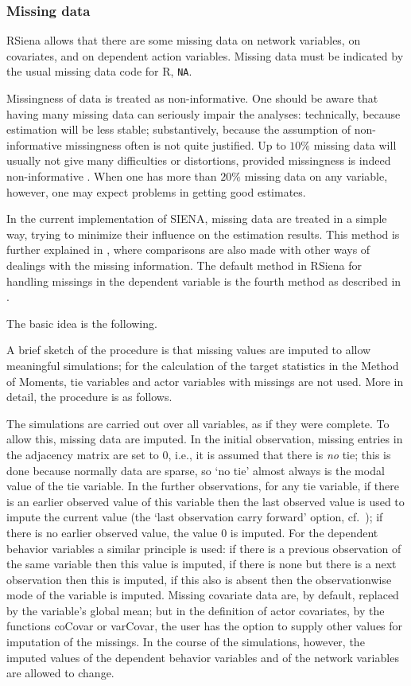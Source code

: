 \documentclass[a4paper,fleqn,11pt]{article}
\newcommand{\+}{\, + \,}
\newcommand{\sfn}[1]{\textsf{#1}}
\newcommand{\Rn}{{\sf R}}
\newcommand{\RS}{{\sf \textsf{RSiena} }}
\newcommand{\si}{{\sf SIENA}}
\begin{document}
\subsubsection{Missing data}
\label{S_missing}

\RS allows that there are some missing data on network variables,
on covariates, and on dependent action
variables.  Missing data must be indicated by
the usual missing data code for \Rn, \texttt{NA}.

Missingness of data is treated as non-informative.
One should be aware that having many missing data can seriously
impair the analyses: technically, because estimation will be
less stable; substantively, because the assumption of
non-informative missingness often is not quite justified.
Up to $10\%$ missing data will usually not give many difficulties
or distortions, provided missingness is indeed non-informative
\citep{HuismanSteglich08}.
When one has more than $20\%$ missing data on any variable, however,
one may expect problems in getting good estimates.

In the current implementation of \si, missing data are treated in
a simple way, trying to minimize their influence on the estimation
results.
This method is further explained in \citet{HuismanSteglich08},
where comparisons are also made with other ways of dealings with the missing
information. The default method in \RS for handling missings in the dependent
variable is the fourth method as described in \citet{HuismanSteglich08}.

The basic idea is the following.
\medskip

A brief sketch of the procedure is that
missing values are imputed to allow meaningful simulations;
for the calculation of the target statistics in the Method of Moments,
tie variables and actor variables with missings are not
used.
More in detail, the procedure is as follows.

The simulations are carried out over all variables,
as if they were complete.
To allow this, missing data are imputed.
In the initial observation, missing entries in the adjacency
matrix are set to 0,
i.e., it is assumed that there is \emph{no} tie;
this is done because normally data are sparse, so `no tie'
almost always is the modal value of the tie variable.
In the further observations, for any tie variable,
if there is an earlier observed value of this variable then
the last observed value is used to impute the current
value (the `last observation carry forward' option,
cf.\ \citet{Lepkowski89}); if there is no earlier observed
value, the value 0 is imputed.
For the dependent behavior variables a similar principle
is used: if there is a previous observation of the same variable
then this value is imputed, if there is none but there
is a next observation then this is imputed, if this also is absent
then the observationwise mode of the variable is imputed.
Missing covariate data are, by default, replaced by the
variable's global mean; but in the definition of actor covariates,
by the functions \sfn{coCovar} or \sfn{varCovar}, the user
has the option to supply other values for imputation of the missings.
In the course of the simulations, however, the imputed values of the dependent
behavior variables and of the network variables are allowed to change.
\medskip
\end{document}
